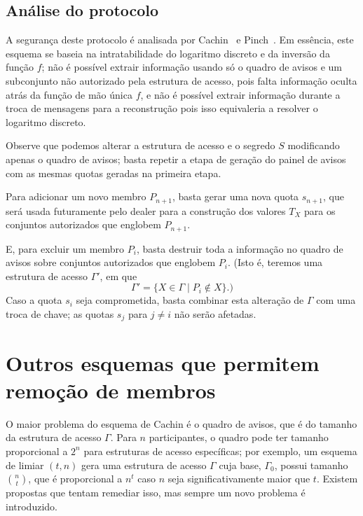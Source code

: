 \documentclass[10pt,twocolumn]{article}
\theoremstyle{definition}
\begin{document}
\subsection{Análise do protocolo}

A segurança deste protocolo é analisada por Cachin~\cite[p.~5]{Cachin1995}
e Pinch~\cite[p.~4]{Pinch1996}.
Em essência,
este esquema se baseia na intratabilidade do logaritmo discreto
e da inversão da função $f$;
não é possível extrair informação usando só o quadro de avisos
e um subconjunto não autorizado pela estrutura de acesso,
pois falta informação oculta atrás da função de mão única $f$,
e não é possível extrair informação durante a troca de mensagens para a reconstrução
pois isso equivaleria a resolver o logaritmo discreto.

Observe que podemos alterar a estrutura de acesso
e o segredo $S$
modificando apenas o quadro de avisos;
basta repetir a etapa de geração do painel de avisos
com as mesmas quotas geradas na primeira etapa.

Para adicionar um novo membro $P_{n+1}$,
basta gerar uma nova quota $s_{n+1}$,
que será usada futuramente pelo dealer
para a construção dos valores $T_X$
para os conjuntos autorizados que englobem $P_{n+1}$.

E, para excluir um membro $P_i$,
basta destruir toda a informação no quadro de avisos
sobre conjuntos autorizados que englobem $P_i$.
(Isto é,
teremos uma estrutura de acesso $\Gamma'$, em que
\begin{equation*}
    \Gamma' = \{X \in \Gamma \mid P_i \notin X\}.)
\end{equation*}
Caso a quota $s_i$ seja comprometida,
basta combinar esta alteração de $\Gamma$ com uma troca de chave;
as quotas $s_j$ para $j \neq i$ não serão afetadas.

\section{Outros esquemas que permitem remoção de membros}

O maior problema do esquema de Cachin é o quadro de avisos,
que é do tamanho da estrutura de acesso $\Gamma$.
Para $n$ participantes,
o quadro pode ter tamanho proporcional a $2^n$
para estruturas de acesso específicas;
por exemplo,
um esquema de limiar $(t, n)$
gera uma estrutura de acesso $\Gamma$
cuja base, $\Gamma_0$,
possui tamanho $\binom n t$,
que é proporcional a $n^t$ caso $n$ seja significativamente maior que $t$.
Existem propostas que tentam remediar isso,
mas sempre um novo problema é introduzido.
\end{document}
